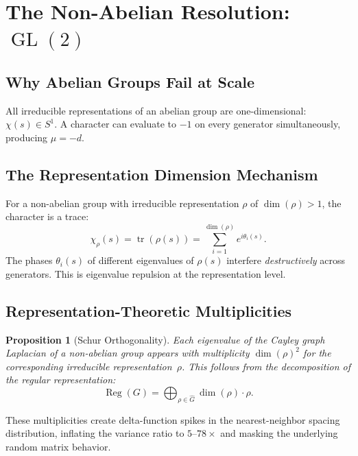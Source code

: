 \documentclass[12pt,reqno]{amsart}
\theoremstyle{plain}
\newtheorem{proposition}[theorem]{Proposition}
\theoremstyle{definition}
\theoremstyle{remark}
\DeclareMathOperator{\GL}{GL}
\DeclareMathOperator{\tr}{tr}
\DeclareMathOperator{\Reg}{Reg}
\begin{document}
\section{The Non-Abelian Resolution: $\GL(2)$}\label{sec:gl2}

\subsection{Why Abelian Groups Fail at Scale}

All irreducible representations of an abelian group are
one-dimensional: $\chi(s) \in S^1$.  A character can evaluate to $-1$
on every generator simultaneously, producing $\mu = -d$.

\subsection{The Representation Dimension Mechanism}

For a non-abelian group with irreducible representation $\rho$ of
$\dim(\rho) > 1$, the character is a trace:
\begin{equation}\label{eq:trace_char}
  \chi_\rho(s) = \tr(\rho(s))
  = \sum_{i=1}^{\dim(\rho)} e^{i\theta_i(s)}.
\end{equation}
The phases $\theta_i(s)$ of different eigenvalues of $\rho(s)$
interfere \emph{destructively} across generators.  This is eigenvalue
repulsion at the representation level.

\subsection{Representation-Theoretic Multiplicities}

\begin{proposition}[Schur Orthogonality]\label{prop:schur}
  Each eigenvalue of the Cayley graph Laplacian of a non-abelian group
  appears with multiplicity $\dim(\rho)^2$ for the corresponding
  irreducible representation~$\rho$.  This follows from the
  decomposition of the regular representation:
  \begin{equation}\label{eq:reg_decomp}
    \Reg(G) = \bigoplus_{\rho \in \hat{G}} \dim(\rho) \cdot \rho.
  \end{equation}
\end{proposition}

These multiplicities create delta-function spikes in the
nearest-neighbor spacing distribution, inflating the variance ratio to
$5$--$78\times$ and masking the underlying random matrix behavior.
\end{document}

